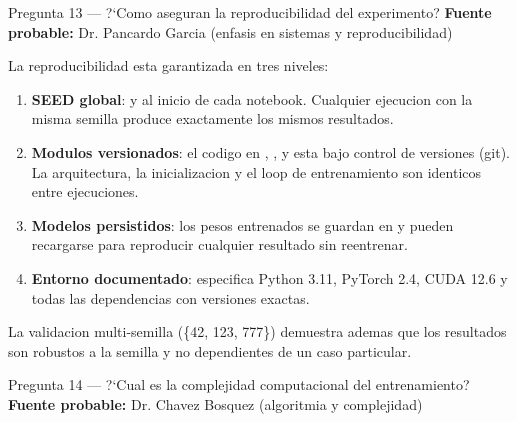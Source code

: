 \vspace{8pt}

\begin{qabox}{Pregunta 13 --- ?`Como aseguran la reproducibilidad del experimento?}
\textbf{Fuente probable:} Dr. Pancardo Garcia (enfasis en sistemas y reproducibilidad)
\end{qabox}

\begin{answerbox}
La reproducibilidad esta garantizada en tres niveles:

\begin{enumerate}
  \item \textbf{SEED global}:  y 
        al inicio de cada notebook. Cualquier ejecucion con la misma semilla produce
        exactamente los mismos resultados.

  \item \textbf{Modulos versionados}: el codigo en ,
        ,  y  esta bajo
        control de versiones (git). La arquitectura, la inicializacion y el loop de
        entrenamiento son identicos entre ejecuciones.

  \item \textbf{Modelos persistidos}: los pesos entrenados se guardan en
         y pueden recargarse para reproducir
        cualquier resultado sin reentrenar.

  \item \textbf{Entorno documentado}:  especifica Python 3.11,
        PyTorch 2.4, CUDA 12.6 y todas las dependencias con versiones exactas.
\end{enumerate}

La validacion multi-semilla (\{42, 123, 777\}) demuestra ademas que los resultados
son robustos a la semilla y no dependientes de un caso particular.
\end{answerbox}

\vspace{8pt}

\begin{qabox}{Pregunta 14 --- ?`Cual es la complejidad computacional del entrenamiento?}
\textbf{Fuente probable:} Dr. Chavez Bosquez (algoritmia y complejidad)
\end{qabox}

